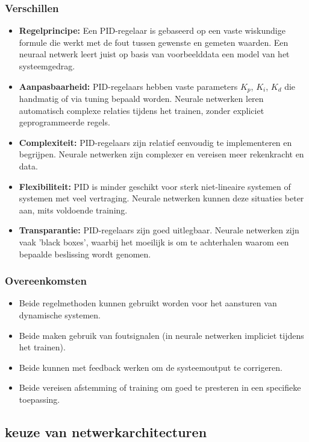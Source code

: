 \subsubsection{Verschillen}
\begin{itemize}
  \item \textbf{Regelprincipe:} Een PID-regelaar is gebaseerd op een vaste wiskundige formule die werkt met de fout tussen gewenste en gemeten waarden. Een neuraal netwerk leert juist op basis van voorbeelddata een model van het systeemgedrag.
  \item \textbf{Aanpasbaarheid:} PID-regelaars hebben vaste parameters \(K_p\), \(K_i\), \(K_d\) die handmatig of via tuning bepaald worden. Neurale netwerken leren automatisch complexe relaties tijdens het trainen, zonder expliciet geprogrammeerde regels. 
  \item \textbf{Complexiteit:} PID-regelaars zijn relatief eenvoudig te implementeren en begrijpen. Neurale netwerken zijn complexer en vereisen meer rekenkracht en data.
  \item \textbf{Flexibiliteit:} PID is minder geschikt voor sterk niet-lineaire systemen of systemen met veel vertraging. Neurale netwerken kunnen deze situaties beter aan, mits voldoende training.
  \item \textbf{Transparantie:} PID-regelaars zijn goed uitlegbaar. Neurale netwerken zijn vaak 'black boxes', waarbij het moeilijk is om te achterhalen waarom een bepaalde beslissing wordt genomen.
\end{itemize}
\subsubsection{Overeenkomsten}
\begin{itemize}
  \item Beide regelmethoden kunnen gebruikt worden voor het aansturen van dynamische systemen.
  \item Beide maken gebruik van foutsignalen (in neurale netwerken impliciet tijdens het trainen).
  \item Beide kunnen met feedback werken om de systeemoutput te corrigeren.
  \item Beide vereisen afstemming of training om goed te presteren in een specifieke toepassing.
\end{itemize}







\subsection{keuze van netwerkarchitecturen }






